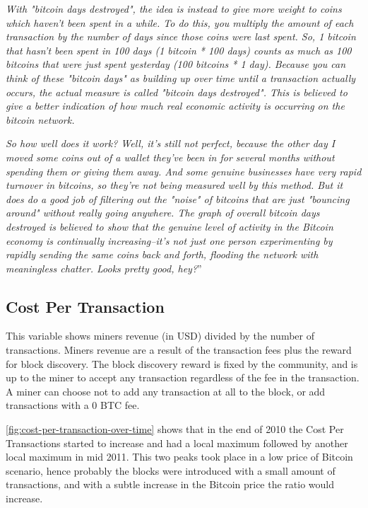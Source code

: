 \textit{With "bitcoin days destroyed", the idea is instead to give
  more weight to coins which haven't been spent in a while. To do
  this, you multiply the amount of each transaction by the number of
  days since those coins were last spent. So, 1 bitcoin that hasn't
  been spent in 100 days (1 bitcoin * 100 days) counts as much as 100
  bitcoins that were just spent yesterday (100 bitcoins * 1 day).
  Because you can think of these "bitcoin days" as building up over
  time until a transaction actually occurs, the actual measure is
  called "bitcoin days destroyed". This is believed to give a better
  indication of how much real economic activity is occurring on the
  bitcoin network.}

\textit{ So how well does it work? Well, it's still not perfect,
  because the other day I moved some coins out of a wallet they've
  been in for several months without spending them or giving them
  away. And some genuine businesses have very rapid turnover in
  bitcoins, so they're not being measured well by this method. But it
  does do a good job of filtering out the "noise" of bitcoins that are
  just "bouncing around" without really going anywhere. The graph of
  overall bitcoin days destroyed is believed to show that the genuine
  level of activity in the Bitcoin economy is continually
  increasing--it's not just one person experimenting by rapidly
  sending the same coins back and forth, flooding the network with
  meaningless chatter. Looks pretty good, hey?}''


\subsection{Cost Per Transaction}
\label{sec:cost-per-transaction}

This variable shows miners revenue (in USD) divided by the number of
transactions. Miners revenue are a result of the transaction fees plus
the reward for block discovery. The block discovery reward is fixed by
the community, and is up to the miner to accept any transaction
regardless of the fee in the transaction. A miner can choose not to
add any transaction at all to the block, or add transactions with a
$0$ BTC fee.

\autoref{fig:cost-per-transaction-over-time} shows that in the end of
2010 the Cost Per Transactions started to increase and had a local
maximum followed by another local maximum in mid 2011. This two peaks
took place in a low price of Bitcoin scenario, hence probably the
blocks were introduced with a small amount of transactions, and with a
subtle increase in the Bitcoin price the ratio would increase.


